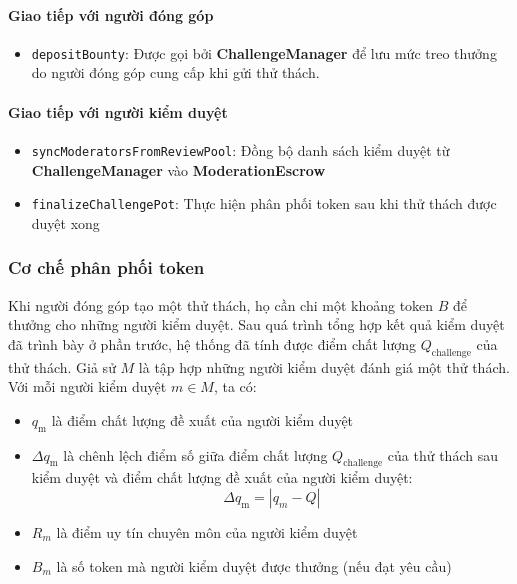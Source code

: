 \paragraph{Giao tiếp với người đóng góp}

\begin{itemize}
  \item \texttt{depositBounty}: Được gọi bởi \textbf{ChallengeManager} để lưu mức treo thưởng do người đóng góp cung cấp khi gửi thử thách.
\end{itemize}

\paragraph{Giao tiếp với người kiểm duyệt}

\begin{itemize}
  \item \texttt{syncModeratorsFromReviewPool}: Đồng bộ danh sách kiểm duyệt từ \textbf{ChallengeManager} vào \textbf{ModerationEscrow}
  \item \texttt{finalizeChallengePot}: Thực hiện phân phối token sau khi thử thách được duyệt xong
\end{itemize}

\subsubsection{Cơ chế phân phối token}

Khi người đóng góp tạo một thử thách, họ cần chi một khoảng token $B$ để thưởng cho những người kiểm duyệt. Sau quá trình tổng hợp kết quả kiểm duyệt đã trình bày ở phần trước, hệ thống đã tính được điểm chất lượng $Q_{\text{challenge}}$ của thử thách. 
Giả sử $M$ là tập hợp những người kiểm duyệt đánh giá một thử thách. Với mỗi người kiểm duyệt $m \in M$, ta có:
\begin{itemize}
  \item $q_{\text{m}}$ là điểm chất lượng đề xuất của người kiểm duyệt 
  \item $\Delta q_{\text{m}}$ là chênh lệch điểm số giữa điểm chất lượng $Q_{\text{challenge}}$ của thử thách sau kiểm duyệt và điểm chất lượng đề xuất của người kiểm duyệt: 
    \[\Delta q_{\text{m}} = |q_{m}-Q|\]
  \item $R_{m}$ là điểm uy tín chuyên môn của người kiểm duyệt
  \item $B_{m}$ là số token mà người kiểm duyệt được thưởng (nếu đạt yêu cầu)
\end{itemize}

